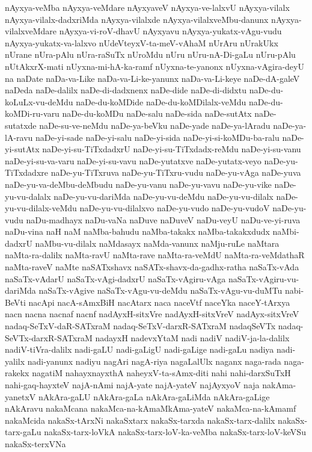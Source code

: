 {nAyxya-veMba
nAyxya-veMdare
nAyxyaveV
nAyxya-ve-lalxvU
nAyxya-vilalx
nAyxya-vilalx-dadxriMda
nAyxya-vilalxde
nAyxya-vilalxveMbu-danunx
nAyxya-vilalxveMdare
nAyxya-vi-roV-dhavU
nAyxyavu
nAyxya-yukatx-vAgu-vudu
nAyxya-yukatx-va-lalxvo
nUdeVteyxV-ta-meV-vAhaM
nUrAru
nUrakUkx
nUrane
nUra-pAlu
nUra-raSuTx
nUroMdu
nUru
nUru-nA-Di-gaLu
nUru-pAlu
nUtAkxrX-mati
nUyxna-mi-hA-ka-ramf
nUyxna-te-yanonx
nUyxna-vAgira-deyU
na
naDate
naDa-va-Like
naDa-va-Li-ke-yanunx
naDa-va-Li-keye
naDe-dA-galeV
naDeda
naDe-dalilx
naDe-di-dadxnenx
naDe-dide
naDe-di-didxtu
naDe-du-koLuLx-vu-deMdu
naDe-du-koMDide
naDe-du-koMDilalx-veMdu
naDe-du-koMDi-ru-varu
naDe-du-koMDu
naDe-salu
naDe-sida
naDe-sutAtx
naDe-sutatxde
naDe-su-ve-neMdu
naDe-ya-beVku
naDe-yade
naDe-ya-lAradu
naDe-ya-lA-ravu
naDe-yi-sade
naDe-yi-salu
naDe-yi-sida
naDe-yi-si-koMDu-ba-ralu
naDe-yi-sutAtx
naDe-yi-su-TiTxdadxrU
naDe-yi-su-TiTxdadx-reMdu
naDe-yi-su-vanu
naDe-yi-su-va-varu
naDe-yi-su-vavu
naDe-yutatxve
naDe-yutatx-veyo
naDe-yu-TiTxdadxre
naDe-yu-TiTxruva
naDe-yu-TiTxru-vudu
naDe-yu-vAga
naDe-yuva
naDe-yu-va-deMbu-deMbudu
naDe-yu-vanu
naDe-yu-vavu
naDe-yu-vike
naDe-yu-vu-dalalx
naDe-yu-vu-dariMda
naDe-yu-vu-deMdu
naDe-yu-vu-dilalx
naDe-yu-vu-dilalx-veMdu
naDe-yu-vu-dilalxvo
naDe-yu-vudo
naDe-yu-vudoV
naDe-yu-vudu
naDu-madhayx
naDu-vaNa
naDuve
naDuveV
naDu-veyU
naDu-ve-yi-ruva
naDu-vina
naH
naM
naMba-bahudu
naMba-takakx
naMba-takakxdudx
naMbi-dadxrU
naMbu-vu-dilalx
naMdasayx
naMda-vanunx
naMju-ruLe
naMtara
naMta-ra-dalilx
naMta-ravU
naMta-rave
naMta-ra-veMdU
naMta-ra-veMdathaR
naMta-raveV
naMte
naSATxshavx
naSATx-shavx-da-gadhx-ratha
naSaTx-vAda
naSaTx-vAdarU
naSaTx-vAgi-dadxrU
naSaTx-vAgiru-vAga
naSaTx-vAgiru-vu-dariMda
naSaTx-vAgive
naSaTx-vAgu-vu-deMdu
naSaTx-vAgu-vu-duMTu
nabi-BeVti
nacApi
nacA-sAmxBiH
nacAtarx
naca
naceVtf
naceYka
naceY-tArxya
nacn
nacna
nacnaf
nacnf
nadAyxH-sitxVre
nadAyxH-sitxVreV
nadAyx-sitxVreV
nadaq-SeTxV-daR-SATxraM
nadaq-SeTxV-darxR-SATxraM
nadaqSeVTx
nadaq-SeVTx-darxR-SATxraM
nadayxH
nadevxYtaM
nadi
nadiV
nadiV-ja-la-dalilx
nadiV-tiVra-dalilx
nadi-gaLU
nadi-gaLigU
nadi-gaLige
nadi-gaLu
nadiya
nadi-yalilx
nadi-yanunx
nadiyu
nagAri
nagA-riya
nagaLalUlx
naganx
naga-rada
naga-rakekx
nagatiM
nahayxnayxthA
naheyxV-ta-sAmx-diti
nahi
nahi-darxSuTxH
nahi-gaq-hayxteV
najA-nAmi
najA-yate
najA-yateV
najAyxyoV
naja
nakAma-yanetxV
nAkAra-gaLU
nAkAra-gaLa
nAkAra-gaLiMda
nAkAra-gaLige
nAkAravu
nakaMcana
nakaMca-na-kAmaMkAma-yateV
nakaMca-na-kAmamf
nakaMcida
nakaSx-tArxNi
nakaSxtarx
nakaSx-tarxda
nakaSx-tarx-dalilx
nakaSx-tarx-gaLu
nakaSx-tarx-loVkA
nakaSx-tarx-loV-ka-veMba
nakaSx-tarx-loV-keVSu
nakaSx-terxVNa
}
